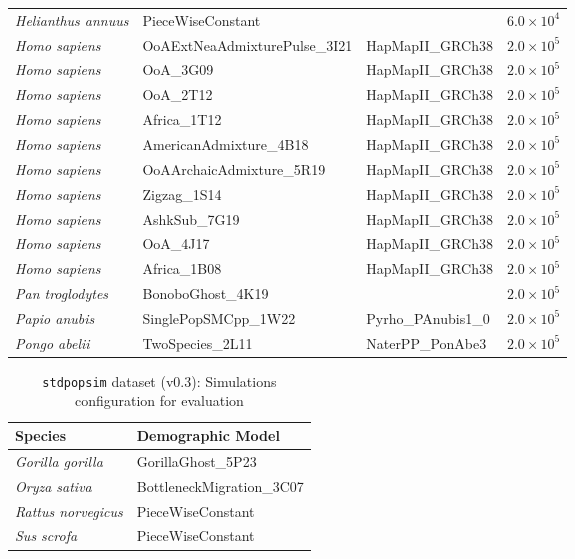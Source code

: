 \documentclass[9pt,twoside]{pnas-new}
\newcommand{\stdpopsim}{\texttt{stdpopsim}\xspace}
\begin{document}
\begin{table}[t]
{\begin{tabular}{llll}
        \emph{Helianthus annuus}    & PieceWiseConstant & & $6.0\times10^{4}$ \\
        \emph{Homo sapiens}    & OoAExtNeaAdmixturePulse\_3I21 & HapMapII\_GRCh38 & $2.0\times10^{5}$ \\
        \emph{Homo sapiens}    & OoA\_3G09 & HapMapII\_GRCh38 & $2.0\times10^{5}$ \\
        \emph{Homo sapiens}    & OoA\_2T12 & HapMapII\_GRCh38 & $2.0\times10^{5}$ \\
        \emph{Homo sapiens}    & Africa\_1T12 & HapMapII\_GRCh38 & $2.0\times10^{5}$ \\
        \emph{Homo sapiens}    & AmericanAdmixture\_4B18 & HapMapII\_GRCh38 & $2.0\times10^{5}$ \\
        \emph{Homo sapiens}    & OoAArchaicAdmixture\_5R19 & HapMapII\_GRCh38 & $2.0\times10^{5}$ \\
        \emph{Homo sapiens}    & Zigzag\_1S14 & HapMapII\_GRCh38 & $2.0\times10^{5}$ \\
        \emph{Homo sapiens}    & AshkSub\_7G19 & HapMapII\_GRCh38 & $2.0\times10^{5}$ \\
        \emph{Homo sapiens}    & OoA\_4J17 & HapMapII\_GRCh38 & $2.0\times10^{5}$ \\
        \emph{Homo sapiens}    & Africa\_1B08 & HapMapII\_GRCh38 & $2.0\times10^{5}$ \\
        \emph{Pan troglodytes}    & BonoboGhost\_4K19 & & $2.0\times10^{5}$ \\
        \emph{Papio anubis}    & SinglePopSMCpp\_1W22 & Pyrho\_PAnubis1\_0 & $2.0\times10^{5}$ \\
        \emph{Pongo abelii}    & TwoSpecies\_2L11 & NaterPP\_PonAbe3 & $2.0\times10^{5}$ \\
        \bottomrule
    \end{tabular}
    }
\end{table}



\begin{table}[h!]
    \centering
    \caption{\stdpopsim dataset (v0.3): Simulations configuration for evaluation}
    \label{tab:stdpopsim-dataset-v0.3}
    \begin{tabular}{ll}
        \toprule
        \textbf{Species} & \textbf{Demographic Model}\\
        \midrule
        \emph{Gorilla gorilla}    & GorillaGhost\_5P23 \\
        \emph{Oryza sativa}    & BottleneckMigration\_3C07  \\
        \emph{Rattus norvegicus}    & PieceWiseConstant  \\
        \emph{Sus scrofa}    & PieceWiseConstant \\
        \bottomrule
    \end{tabular}
\end{table}
\end{document}
